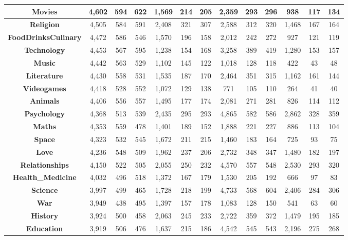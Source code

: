 \begin{table}[t]
{\begin{tabular}{|c||c|c|c||c|c|c||c|c|c||c|c|c|}
\textbf{Movies} & 4,602 & 594 & 622 & 1,569 & 214 & 205 & 2,359 & 293 & 296 & 938 & 117 & 134\\ \hline
\textbf{Religion} & 4,505 & 584 & 591 & 2,408 & 321 & 307 & 2,588 & 312 & 320 & 1,468 & 167 & 164\\ \hline
\textbf{FoodDrinksCulinary} & 4,472 & 586 & 546 & 1,570 & 196 & 158 & 2,012 & 242 & 272 & 927 & 121 & 119\\ \hline
\textbf{Technology} & 4,453 & 567 & 595 & 1,238 & 154 & 168 & 3,258 & 389 & 419 & 1,280 & 153 & 157\\ \hline
\textbf{Music} & 4,442 & 563 & 529 & 1,102 & 145 & 122 & 1,018 & 128 & 118 & 422 & 43 & 48\\ \hline
\textbf{Literature} & 4,430 & 558 & 531 & 1,535 & 187 & 170 & 2,464 & 351 & 315 & 1,162 & 161 & 144\\ \hline
\textbf{Videogames} & 4,418 & 528 & 552 & 1,072 & 129 & 138 & 771 & 105 & 110 & 264 & 41 & 40\\ \hline
\textbf{Animals} & 4,406 & 556 & 557 & 1,495 & 177 & 174 & 2,081 & 271 & 281 & 826 & 114 & 112\\ \hline
\textbf{Psychology} & 4,368 & 513 & 539 & 2,435 & 295 & 293 & 4,865 & 582 & 586 & 2,862 & 328 & 359\\ \hline
\textbf{Maths} & 4,353 & 559 & 478 & 1,401 & 189 & 152 & 1,888 & 221 & 227 & 886 & 113 & 104\\ \hline
\textbf{Space} & 4,323 & 532 & 545 & 1,672 & 211 & 215 & 1,460 & 183 & 164 & 725 & 93 & 75\\ \hline
\textbf{Love} & 4,236 & 548 & 509 & 1,962 & 237 & 206 & 2,732 & 348 & 347 & 1,480 & 182 & 197\\ \hline
\textbf{Relationships} & 4,150 & 522 & 505 & 2,055 & 250 & 232 & 4,570 & 557 & 548 & 2,530 & 293 & 320\\ \hline
\textbf{Health\_Medicine} & 4,032 & 496 & 518 & 1,372 & 167 & 179 & 1,530 & 205 & 192 & 666 & 97 & 83\\ \hline
\textbf{Science} & 3,997 & 499 & 465 & 1,728 & 218 & 199 & 4,733 & 568 & 604 & 2,406 & 284 & 306\\ \hline
\textbf{War} & 3,949 & 438 & 495 & 1,397 & 157 & 178 & 1,083 & 128 & 150 & 541 & 63 & 60\\ \hline
\textbf{History} & 3,924 & 500 & 458 & 2,063 & 245 & 233 & 2,722 & 359 & 372 & 1,479 & 195 & 185\\ \hline
\textbf{Education} & 3,919 & 506 & 476 & 1,637 & 215 & 186 & 4,542 & 545 & 543 & 2,196 & 275 & 268\\ \hline

\end{tabular}}
\end{table}
